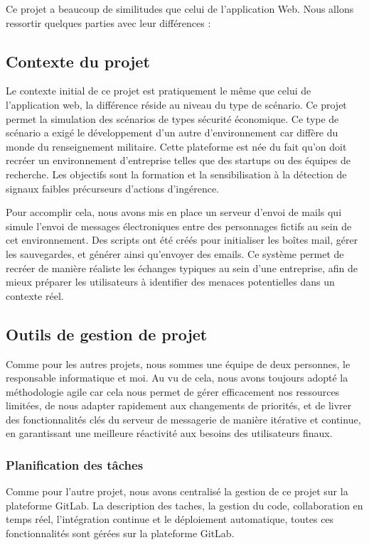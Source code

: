 Ce projet a beaucoup de similitudes que celui de l'application Web. Nous allons ressortir quelques parties avec leur différences :


\subsection{Contexte du projet}
Le contexte initial de ce projet est pratiquement le même que celui de l'application web, la différence réside au niveau du type de scénario.
Ce projet permet la simulation des scénarios de types sécurité économique.
Ce type de scénario a exigé le développement d'un autre d'environnement car diffère du monde du renseignement militaire.
Cette plateforme est née du fait qu'on doit recréer un environnement d’entreprise telles que des startups ou des équipes de recherche.
Les objectifs sont la formation et la sensibilisation à la détection de signaux faibles précurseurs d’actions d’ingérence.

Pour accomplir cela, nous avons mis en place un serveur d'envoi de mails qui simule l'envoi de messages électroniques entre des personnages fictifs au sein de cet environnement.
Des scripts ont été créés pour initialiser les boîtes mail, gérer les sauvegardes, et générer ainsi qu'envoyer des emails.
Ce système permet de recréer de manière réaliste les échanges typiques au sein d'une entreprise, afin de mieux préparer les utilisateurs à identifier des menaces potentielles dans un contexte réel.


\subsection{Outils de gestion de projet}
Comme pour les autres projets, nous sommes une équipe de deux personnes, le responsable informatique et moi. Au vu de cela, nous avons toujours adopté la méthodologie agile car cela nous permet de gérer efficacement nos ressources limitées, de nous adapter rapidement aux changements de priorités, et de livrer des fonctionnalités clés du serveur de messagerie de manière itérative et continue, en garantissant une meilleure réactivité aux besoins des utilisateurs finaux.

\subsubsection{Planification des tâches}
Comme pour l'autre projet, nous avons centralisé la gestion de ce projet sur la plateforme GitLab.
La description des taches, la gestion du code, collaboration en temps réel, l’intégration continue et le déploiement automatique, toutes ces fonctionnalités sont gérées sur la plateforme GitLab.

